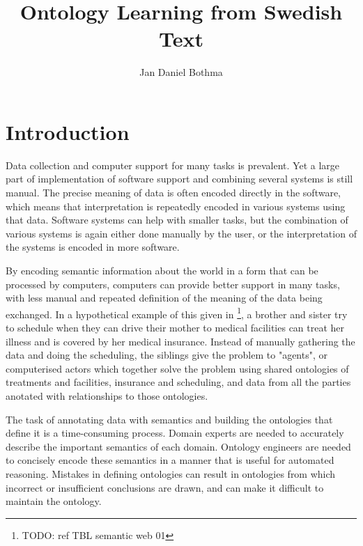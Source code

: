 \documentclass[a4paper]{report}
\title{Ontology Learning from Swedish Text}
\author{Jan Daniel Bothma}
\newcommand{\todo}[1]{\footnote{{\color{red} TODO: #1}}}
\begin{document}
\maketitle

\begin{abstract}
\end{abstract}	

\tableofcontents

\chapter{Introduction}

Data collection and computer support for many tasks is prevalent.
Yet a large part of implementation of software support and combining several systems is still manual.
The precise meaning of data is often encoded directly in the software, which means that interpretation is repeatedly encoded in various systems using that data.
Software systems can help with smaller tasks, but the combination of various systems is again either done manually by the user, or the interpretation of the systems is encoded in more software.

By encoding semantic information about the world in a form that can be processed by computers, computers can provide better support in many tasks, with less manual and repeated definition of the meaning of the data being exchanged.
In a hypothetical example of this given in \todo{ref TBL semantic web 01}, a brother and sister try to schedule when they can drive their mother to medical facilities can treat her illness and is covered by her medical insurance.
Instead of manually gathering the data and doing the scheduling, the siblings give the problem to "agents", or computerised actors which together solve the problem using shared ontologies of treatments and facilities, insurance and scheduling, and data from all the parties anotated with relationships to those ontologies.

The task of annotating data with semantics and building the ontologies that define it is a time-consuming process.
Domain experts are needed to accurately describe the important semantics of each domain.
Ontology engineers are needed to concisely encode these semantics in a manner that is useful for automated reasoning.
Mistakes in defining ontologies can result in ontologies from which incorrect or insufficient conclusions are drawn, and can make it difficult to maintain the ontology.
\end{document}
